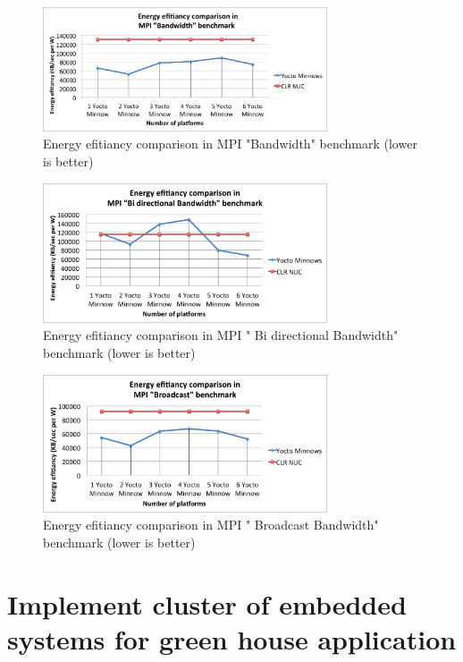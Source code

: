 \begin{figure}[H]
\centering
\includegraphics[width=0.75\textwidth]{images/energy_results/bandwidth.png}
\caption{Energy efitiancy comparison in MPI "Bandwidth" benchmark (lower is
better)}
\label{bandwidth_energy}
\end{figure}

\begin{figure}[H]
\centering
\includegraphics[width=0.75\textwidth]{images/energy_results/bibw.png}
\caption{Energy efitiancy comparison in MPI " Bi directional Bandwidth" benchmark (lower is
better)}
\label{bibw_energy}
\end{figure}


\begin{figure}[H]
\centering
\includegraphics[width=0.75\textwidth]{images/energy_results/broadcast.png}
\caption{Energy efitiancy comparison in MPI " Broadcast Bandwidth" benchmark (lower is
better)}
\label{broadcast_energy}
\end{figure}


\section{Implement cluster of embedded systems for green house application}


\clearpage
